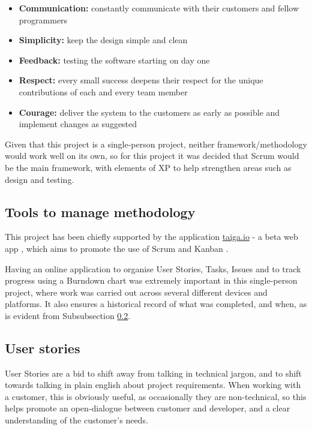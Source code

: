 \begin{itemize}
  \item \textbf{Communication: } constantly communicate with their customers and fellow programmers
  \item \textbf{Simplicity:} keep the design simple and clean
  \item \textbf{Feedback:} testing the software starting on day one
  \item \textbf{Respect: } every small success deepens their respect for the unique contributions of each and every team member
  \item \textbf{Courage: } deliver the system to the customers as early as possible and implement changes as suggested
\end{itemize}

Given that this project is a single-person project, neither framework/methodology would work well on its own, so for this project it was decided that Scrum would be the main framework, with elements of XP to help strengthen areas such as design and testing.

\subsection{Tools to manage methodology}

This project has been chiefly supported by the application \url{taiga.io} - a beta web app \cite{Taiga.io}, which aims to promote the use of Scrum and Kanban \cite{kanban}.

Having an online application to organise User Stories, Tasks, Issues and to track progress using a Burndown chart was extremely important in this single-person project, where work was carried out across several different devices and platforms. It also ensures a historical record of what was completed, and when, as is evident from Subsubsection \ref{ssec:user-stories}.

\subsection{User stories}
\label{ssec:user-stories}

User Stories are a bid to shift away from talking in technical jargon, and to shift towards talking in plain english about project requirements. When working with a customer, this is obviously useful, as occasionally they are non-technical, so this helps promote an open-dialogue between customer and developer, and a clear understanding of the customer's needs.

